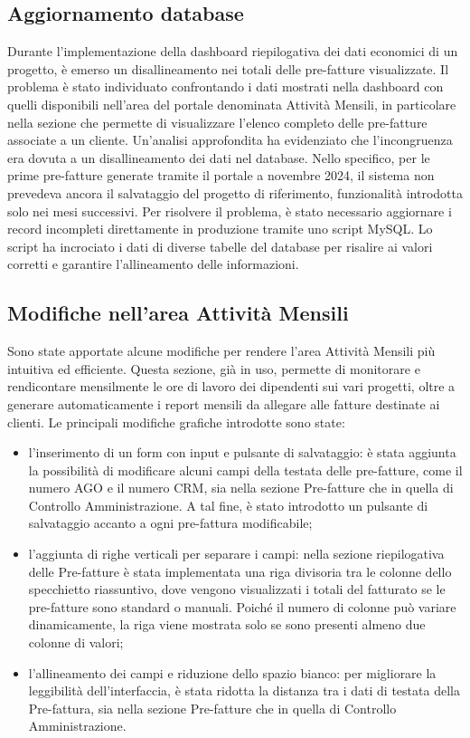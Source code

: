     \subsection{Aggiornamento database}
    Durante l'implementazione della dashboard riepilogativa dei dati economici di un progetto, è emerso un
    disallineamento nei totali delle pre-fatture visualizzate. Il problema è stato individuato confrontando
    i dati mostrati nella dashboard con quelli disponibili nell'area del portale denominata Attività Mensili,
    in particolare nella sezione che permette di visualizzare l’elenco completo delle pre-fatture associate a un cliente.
    Un'analisi approfondita ha evidenziato che l'incongruenza era dovuta a un disallineamento dei dati nel
    database. Nello specifico, per le prime pre-fatture generate tramite il portale a novembre 2024, il sistema
    non prevedeva ancora il salvataggio del progetto di riferimento, funzionalità introdotta solo nei mesi successivi.
    Per risolvere il problema, è stato necessario aggiornare i record incompleti direttamente in produzione tramite
    uno script MySQL. Lo script ha incrociato i dati di diverse tabelle del database per risalire ai valori corretti
    e garantire l'allineamento delle informazioni.

    \subsection{Modifiche nell'area Attività Mensili}
    Sono state apportate alcune modifiche per rendere l'area Attività Mensili più intuitiva ed efficiente.
    Questa sezione, già in uso, permette di monitorare e rendicontare mensilmente le ore di lavoro dei dipendenti
    sui vari progetti, oltre a generare automaticamente i report mensili da allegare alle fatture destinate ai
    clienti. Le principali modifiche grafiche introdotte sono state:
    \begin{itemize}
        \item l'inserimento di un form con input e pulsante di salvataggio: è stata aggiunta la possibilità di
        modificare alcuni campi della testata delle pre-fatture, come il numero AGO e il numero CRM, sia nella
        sezione Pre-fatture che in quella di Controllo Amministrazione. A tal fine, è stato introdotto un pulsante
        di salvataggio accanto a ogni pre-fattura modificabile;
        \item l'aggiunta di righe verticali per separare i campi: nella sezione riepilogativa delle Pre-fatture
        è stata implementata una riga divisoria tra le colonne dello specchietto riassuntivo, dove vengono
        visualizzati i totali del fatturato se le pre-fatture sono standard o manuali. Poiché il numero di
        colonne può variare dinamicamente, la riga viene mostrata solo se sono presenti almeno due colonne di valori;
        \item l'allineamento dei campi e riduzione dello spazio bianco: per migliorare la leggibilità dell’interfaccia,
        è stata ridotta la distanza tra i dati di testata della Pre-fattura, sia nella sezione Pre-fatture che in quella
        di Controllo Amministrazione.
    \end{itemize}

